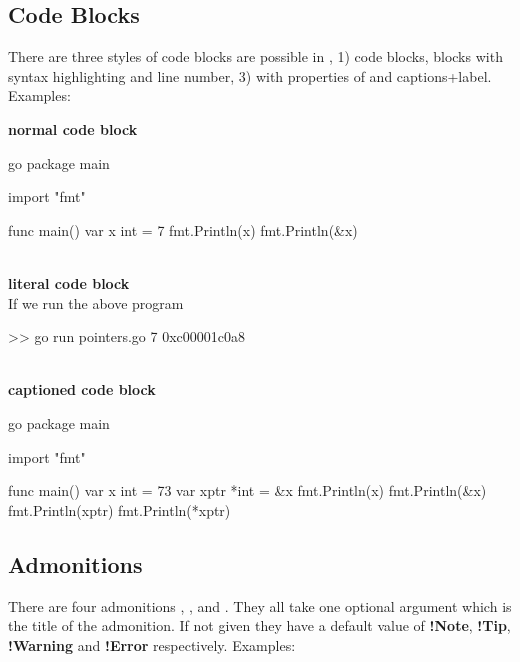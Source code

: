 \documentclass[12pt,a4paper]{report}
\begin{document}
\subsection{Code Blocks}
There are three styles of code blocks are possible in , 1)  code blocks,  blocks with syntax highlighting and line number, 3)  with properties of  and captions+label. Examples:

\noindent
\textbf{normal code block}
\begin{code}{go}
package main

import "fmt"

func main() {
  var x int = 7
  fmt.Println(x)
  fmt.Println(&x)
}
\end{code}\\

\noindent
\textbf{literal code block}\\
If we run the above program
\begin{literal}
>> go run pointers.go
7
0xc00001c0a8
\end{literal}\\

\noindent
\textbf{captioned code block}
\begin{lazycode}[Code Caption,label={myCodeLabel},nameref={code caption}]{go}
package main

import "fmt"

func main() {
  var x int = 73
  var xptr *int = &x
  fmt.Println(x)
  fmt.Println(&x)
  fmt.Println(xptr)
  fmt.Println(*xptr)
}
\end{lazycode}

\subsection{Admonitions}
There are four admonitions , ,  and . They all take one optional argument which is the title of the admonition. If not given they have a default value of \textbf{!Note}, \textbf{!Tip}, \textbf{!Warning} and \textbf{!Error} respectively. Examples:\\
\end{document}
